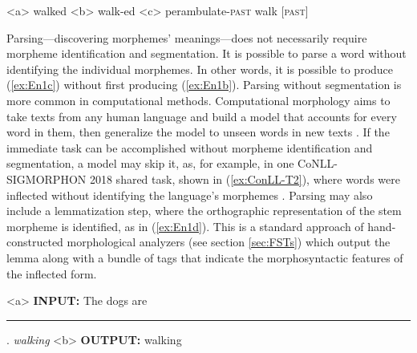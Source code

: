 \documentclass[12pt]{article}
\begin{document}
\begin{singlespace}


\label{ex:En1}
\a<a> walked
\label{ex:En1a}
\a<b> walk-ed
\label{ex:En1b}
\a<c> perambulate-\textsc{past} 
\label{ex:En1c}
\a walk [\textsc{past}]
\label{ex:En1d}
\xe

\end{singlespace}

Parsing---discovering morphemes' meanings---does not necessarily require morpheme identification and segmentation. It is possible to parse a word without identifying the individual morphemes. In other words, it is possible to produce (\ref{ex:En1c}) without first producing (\ref{ex:En1b}). Parsing without segmentation is more common in computational methods. Computational morphology aims to take texts from any human language and build a model that accounts for every word in them, then generalize the model to unseen words in new texts \cite{goldsmith_computational_2017}. If the immediate task can be accomplished without morpheme identification and segmentation, a model may skip it, as, for example, in one CoNLL-SIGMORPHON 2018 shared task, shown in (\ref{ex:ConLL-T2}), where words were inflected without identifying the language's morphemes \cite{cotterell_conllsigmorphon_2018}. Parsing may also include a lemmatization step, where the orthographic representation of the stem morpheme is identified, as in (\ref{ex:En1d}). This is a standard approach of hand-constructed morphological analyzers (see section \ref{sec:FSTs}) which output the lemma along with a bundle of tags that indicate the morphosyntactic features of the inflected form. 

\begin{singlespace}
\label{ex:ConLL-T2}
\a<a> \textbf{INPUT:}  The dogs are \rule{1cm}{0.15mm} .  \hspace{5 mm} \textit{walking}
\label{ex:ConLL-T2a}
\a<b> \textbf{OUTPUT:} walking
\label{ex:ConLL-T2b}
\xe
\end{singlespace}
\end{document}
